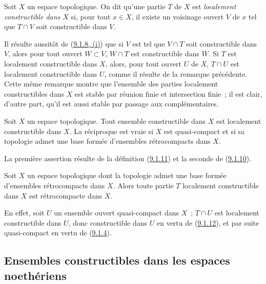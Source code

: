 \begin{definition}[9.1.11]
\label{0.9.1.11-fr}
Soit $X$ un espace topologique. On dit qu'une partie $T$ de $X$ est
\emph{localement constructible dans $X$} si, pour tout $x\in X$, il existe
un voisinage ouvert $V$ de $x$ tel que $T\cap V$ soit constructible dans $V$.
\end{definition}

Il résulte aussitôt de (\hyperref[0.9.1.8-fr]{9.1.8, (i)}) que si $V$ est
tel que $V\cap T$ soit constructible dans $V$, alors pour tout ouvert
$W\subset V$, $W\cap T$ est constructible dans $W$. Si $T$ est localement
constructible dans $X$, alors, pour tout ouvert $U$ de $X$, $T\cap U$ est
localement constructible dans $U$, comme il résulte de la remarque
précédente. Cette même remarque montre que l'ensemble des parties localement
constructibles dans $X$ est stable par réunion finie et intersection finie~;
il est clair, d'autre part, qu'il est aussi stable par passage aux
complémentaires.

\begin{proposition}[9.1.12]
\label{0.9.1.12-fr}
Soit $X$ un espace topologique. Tout ensemble constructible dans $X$ est
localement constructible dans $X$. La réciproque est vraie si $X$ est
quasi-compact et si sa topologie admet une base formée d'ensembles
rétrocompacts dans $X$.
\end{proposition}

La première assertion résulte de la définition
(\hyperref[0.9.1.11-fr]{9.1.11}) et la seconde de
(\hyperref[0.9.1.10-fr]{9.1.10}).

\begin{corollary}[9.1.13]
\label{0.9.1.13-fr}
Soit $X$ un espace topologique dont la topologie admet une base formée
d'ensembles rétrocompacts dans $X$. Alors toute partie $T$ localement
constructible dans $X$ est rétrocompacte dans $X$.
\end{corollary}

En effet, soit $U$ un ensemble ouvert quasi-compact dans $X$~; $T\cap U$ est
localement constructible dans $U$, donc constructible dans $U$ en vertu de
(\hyperref[0.9.1.12-fr]{9.1.12}), et par suite quasi-compact en vertu de
(\hyperref[0.9.1.4-fr]{9.1.4}).

\subsection{Ensembles constructibles dans les espaces noethériens}
\label{subsection:0.9.2-fr}

